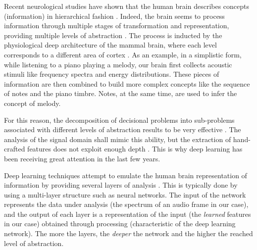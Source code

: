 Recent neurological studies have shown that the human brain describes concepts (information) in hierarchical fashion \cite{Serre2007}. Indeed, the brain seems to process information through multiple stages of transformation and representation, providing multiple levels of abstraction \cite{Haykin1998}. The process is inducted by the physiological deep architecture of the mammal brain, where each level corresponds to a different area of cortex \cite{Serre2007}. As an example, in a simplistic form, while listening to a piano playing a melody, our brain first collects acoustic stimuli like frequency spectra and energy distributions. These pieces of information are then combined to build more complex concepts like the sequence of notes and the piano timbre. Notes, at the same time, are used to infer the concept of melody.

For this reason, the decomposition of decisional problems into sub-problems associated with different levels of abstraction results to be very effective \cite{Humphrey2013}. The analysis of the signal domain shall mimic this ability, but the extraction of hand-crafted features does not exploit enough depth \cite{Bengio2009}. This is why deep learning has been receiving great attention in the last few years.

Deep learning techniques attempt to emulate the human brain representation of information by providing several layers of analysis \cite{Bengio2009}. This is typically done by using a multi-layer structure such as neural networks. The input of the network represents the data under analysis (the spectrum of an audio frame in our case), and the output of each layer is a representation of the input (the \textit{learned} features in our case) obtained through processing (characteristic of the deep learning network). The more the layers, the \textit{deeper} the network and the higher the reached level of abstraction.


